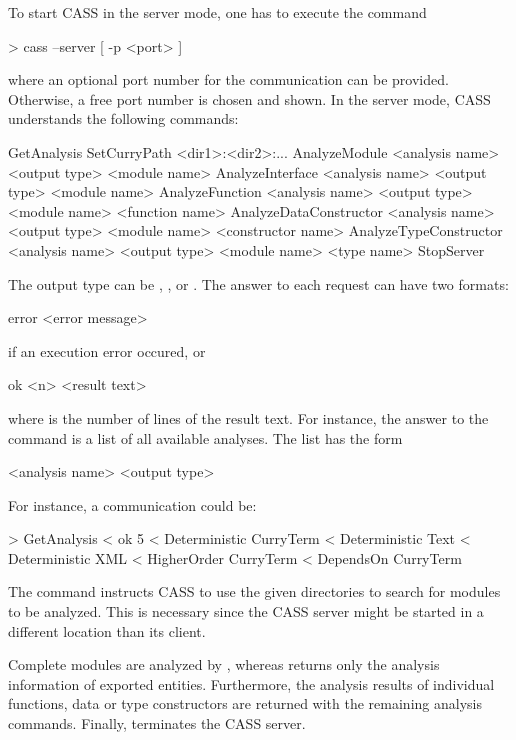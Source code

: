 To start CASS in the server mode, one has to execute the command
\begin{curry}
> cass --server [ -p <port> ]
\end{curry}
where an optional port number for the communication can be
provided. Otherwise, a free port number is chosen and shown. In the
server mode, CASS understands the following commands:
\begin{curry}
GetAnalysis
SetCurryPath <dir1>:<dir2>:...
AnalyzeModule          <analysis name> <output type> <module name>
AnalyzeInterface       <analysis name> <output type> <module name>
AnalyzeFunction        <analysis name> <output type> <module name> <function name>
AnalyzeDataConstructor <analysis name> <output type> <module name> <constructor name>
AnalyzeTypeConstructor <analysis name> <output type> <module name> <type name>
StopServer
\end{curry}
The output type can be , , or .
The answer to each request can have two formats:
\begin{curry}
error <error message>
\end{curry}
if an execution error occured, or
\begin{curry}
ok <n>
<result text>
\end{curry}
where  is the number of lines of the result text.
For instance, the answer to the command 
is a list of all available analyses. The list has the form
\begin{curry}
<analysis name> <output type>
\end{curry}
For instance, a communication could be:
\begin{curry}
> GetAnalysis
< ok 5
< Deterministic CurryTerm
< Deterministic Text
< Deterministic XML
< HigherOrder   CurryTerm
< DependsOn     CurryTerm
\end{curry}
The command  instructs CASS to use the given
directories to search for modules to be analyzed. This is necessary
since the CASS server might be started in a different location than
its client.

Complete modules are analyzed by , whereas
 returns only the analysis information of exported
entities. Furthermore, the analysis results of individual functions,
data or type constructors are returned with the remaining analysis
commands. Finally,  terminates the CASS server.

